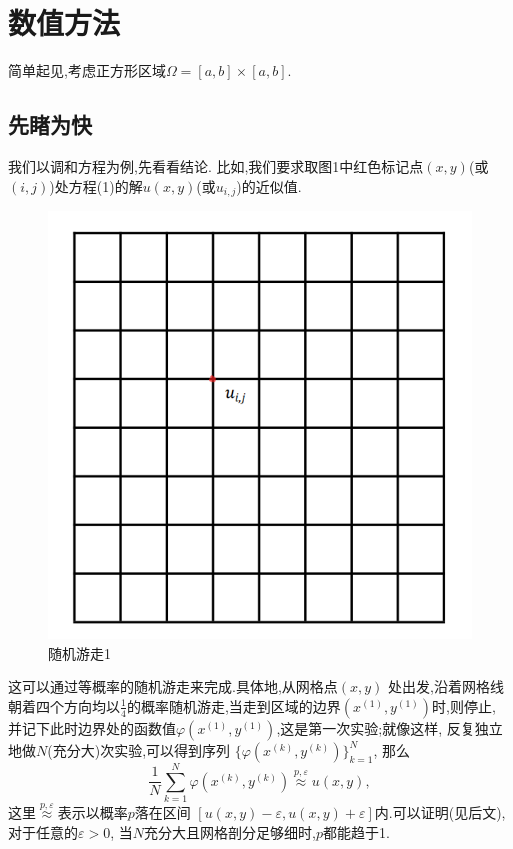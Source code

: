 \documentclass[UTF8,a4paper,notitlepage]{ctexart}%
\theoremstyle{nonumberplain}
\begin{document}
\section{数值方法}
简单起见,考虑正方形区域$\varOmega=[a,b]\times [a,b]$.
\subsection{先睹为快}
我们以调和方程为例,先看看结论.
比如,我们要求取图1中红色标记点$(x,y)$(或$(i,j)$)处方程(1)的解$u(x,y)$(或$u_{i,j}$)的近似值.
\begin{figure}[ht]%
    \centering
    \includegraphics[scale=0.5]{tp2.png}
\caption{随机游走1}\label{fig:tp2}
\end{figure}\par
这可以通过等概率的随机游走来完成.具体地,从网格点$(x,y)$ 
处出发,沿着网格线朝着四个方向均以$\frac{1}{4}$的概率随机游走,当走到区域的边界$(x^{(1)},y^{(1)})$时,则停止,
并记下此时边界处的函数值$\varphi(x^{(1)},y^{(1)})$,这是第一次实验;就像这样,
反复独立地做$N$(充分大)次实验,可以得到序列
$\{\varphi(x^{(k)},y^{(k)})\}_{k=1}^{N}$,
那么
\begin{equation*}
    \frac{1}{N}\sum_{k = 1}^{N} \varphi(x^{(k)},y^{(k)})\stackrel{p,\varepsilon }{\approx}u(x,y) ,
\end{equation*}
这里$\stackrel{p,\varepsilon}{\approx }$表示以概率$p$落在区间
$[u(x,y)-\varepsilon ,u(x,y)+\varepsilon ]$内.可以证明(见后文),
对于任意的$\varepsilon >0$,
当$N$充分大且网格剖分足够细时,$p$都能趋于1.
\end{document}

